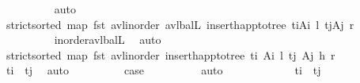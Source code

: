 \begin{isabellebody}
\ \ \ \ \ \ \ \ \isamarkupfalse%
\ auto\isanewline
\ \ \ \ \ \ \isamarkupfalse%
\ \isamarkupfalse%
\ {\isachardoublequoteopen}strict{\isacharunderscore}{\kern0pt}sorted\ {\isacharparenleft}{\kern0pt}map\ fst\ {\isacharparenleft}{\kern0pt}avl{\isacharunderscore}{\kern0pt}inorder\ {\isacharparenleft}{\kern0pt}avl{\isacharunderscore}{\kern0pt}balL\ {\isacharparenleft}{\kern0pt}insert{\isacharunderscore}{\kern0pt}happ{\isacharunderscore}{\kern0pt}to{\isacharunderscore}{\kern0pt}tree\ {\isacharparenleft}{\kern0pt}t\isactrlsub i{\isacharcomma}{\kern0pt}A\isactrlsub i{\isacharparenright}{\kern0pt}\ l{\isacharparenright}{\kern0pt}\ {\isacharparenleft}{\kern0pt}t\isactrlsub j{\isacharcomma}{\kern0pt}A\isactrlsub j{\isacharparenright}{\kern0pt}\ r{\isacharparenright}{\kern0pt}{\isacharparenright}{\kern0pt}{\isacharparenright}{\kern0pt}{\isachardoublequoteclose}\isanewline
\ \ \ \ \ \ \ \ \isamarkupfalse%
\ inorder{\isacharunderscore}{\kern0pt}avl{\isacharunderscore}{\kern0pt}balL\ \isamarkupfalse%
\ auto\isanewline
\ \ \ \ \ \ \isamarkupfalse%
\ \isamarkupfalse%
\ {\isachardoublequoteopen}strict{\isacharunderscore}{\kern0pt}sorted\ {\isacharparenleft}{\kern0pt}map\ fst\ {\isacharparenleft}{\kern0pt}avl{\isacharunderscore}{\kern0pt}inorder\ {\isacharparenleft}{\kern0pt}insert{\isacharunderscore}{\kern0pt}happ{\isacharunderscore}{\kern0pt}to{\isacharunderscore}{\kern0pt}tree\ {\isacharparenleft}{\kern0pt}t\isactrlsub i{\isacharcomma}{\kern0pt}\ A\isactrlsub i{\isacharparenright}{\kern0pt}\ {\isasymlangle}l{\isacharcomma}{\kern0pt}\ {\isacharparenleft}{\kern0pt}{\isacharparenleft}{\kern0pt}t\isactrlsub j{\isacharcomma}{\kern0pt}\ A\isactrlsub j{\isacharparenright}{\kern0pt}{\isacharcomma}{\kern0pt}\ h{\isacharparenright}{\kern0pt}{\isacharcomma}{\kern0pt}\ r{\isasymrangle}{\isacharparenright}{\kern0pt}{\isacharparenright}{\kern0pt}{\isacharparenright}{\kern0pt}{\isachardoublequoteclose}\isanewline
\ \ \ \ \ \ \ \ \isamarkupfalse%
\ {\isacartoucheopen}t\isactrlsub i\ {\isacharless}{\kern0pt}\ t\isactrlsub j{\isacartoucheclose}\ \isamarkupfalse%
\ auto\isanewline
\ \ \ \ \ \ \isamarkupfalse%
\ \isamarkupfalse%
\ {\isacharquery}{\kern0pt}case\isanewline
\ \ \ \ \ \ \ \ \isamarkupfalse%
\ auto\isanewline
\ \ \ \ \isamarkupfalse%
\isanewline
\ \ \ \ \ \ \isamarkupfalse%
\ {\isachardoublequoteopen}t\isactrlsub i\ {\isacharequal}{\kern0pt}\ t\isactrlsub j{\isachardoublequoteclose}\isanewline

\end{isabellebody}
